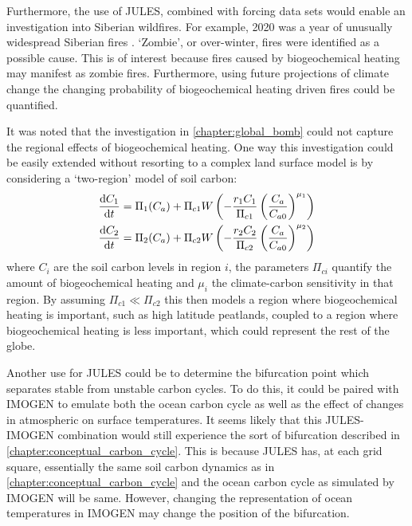 Furthermore, the use of JULES, combined with forcing data sets would enable an investigation into Siberian wildfires. For example, 2020 was a year of unusually widespread
Siberian fires \parencite{Witze2020}. `Zombie', or over-winter, fires were identified as a possible cause. This is of interest because fires
caused by biogeochemical heating may manifest as zombie fires.
Furthermore, using future projections of climate change the changing probability of biogeochemical heating driven fires could be quantified.

It was noted that the investigation in \cref{chapter:global_bomb} could not capture the regional effects of biogeochemical heating. One way this investigation could be easily extended without
resorting to a complex land surface model is by considering a `two-region' model of soil carbon:
\begin{subequations}
  \label{eq:two_region_model}
  \begin{align}
    \dv{C_1}{t} &= \Pi_1(C_a) + \Pi_{c1} W\left(-\frac{r_1C_1}{\Pi_{c1}} \left(\frac{C_a}{C_{a0}}\right)^{\mu_1} \right) \\
    \dv{C_2}{t} &= \Pi_2(C_a) + \Pi_{c2} W\left(-\frac{r_2C_2}{\Pi_{c2}} \left(\frac{C_a}{C_{a0}}\right)^{\mu_2} \right) \\
  \end{align}
\end{subequations}
where $C_i$ are the soil carbon levels in region $i$, the parameters $\Pi_{ci}$ quantify the amount of biogeochemical heating and $\mu_i$ the climate-carbon sensitivity in that region. By assuming
$\Pi_{c1} \ll \Pi_{c2}$ this then models a region where biogeochemical heating is important, such as high latitude peatlands, coupled to a region where biogeochemical heating is less important,
which could represent the rest of the globe.

Another use for JULES could be to determine the bifurcation point which separates stable from unstable carbon cycles. To do this, it could be paired with IMOGEN to emulate both the
ocean carbon cycle as well as the effect of changes in atmospheric  on surface temperatures. It seems likely that this JULES-IMOGEN combination would still experience the sort of
bifurcation described in \cref{chapter:conceptual_carbon_cycle}. This is because JULES has, at each grid square, essentially the same soil carbon dynamics as in \cref{chapter:conceptual_carbon_cycle}
and the ocean carbon cycle as simulated by IMOGEN will be same. However, changing the representation of ocean temperatures in IMOGEN may change the position of the bifurcation.
 
